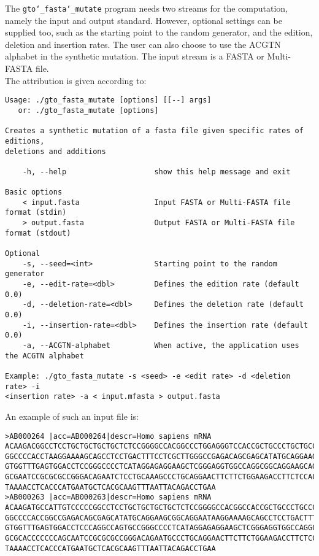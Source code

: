 The \texttt{gto\char`_fasta\char`_mutate} program needs two streams for the computation, namely the input and output standard. However, optional settings can be supplied too, such as the starting point to the random generator, and the edition, deletion and insertion rates. The user can also choose to use the ACGTN alphabet in the synthetic mutation. The input stream is a FASTA or Multi-FASTA file.\\
The attribution is given according to:
\begin{lstlisting}
Usage: ./gto_fasta_mutate [options] [[--] args]
   or: ./gto_fasta_mutate [options]

Creates a synthetic mutation of a fasta file given specific rates of editions, 
deletions and additions

    -h, --help                    show this help message and exit

Basic options
    < input.fasta                 Input FASTA or Multi-FASTA file format (stdin)
    > output.fasta                Output FASTA or Multi-FASTA file format (stdout)

Optional
    -s, --seed=<int>              Starting point to the random generator
    -e, --edit-rate=<dbl>         Defines the edition rate (default 0.0)
    -d, --deletion-rate=<dbl>     Defines the deletion rate (default 0.0)
    -i, --insertion-rate=<dbl>    Defines the insertion rate (default 0.0)
    -a, --ACGTN-alphabet          When active, the application uses the ACGTN alphabet

Example: ./gto_fasta_mutate -s <seed> -e <edit rate> -d <deletion rate> -i 
<insertion rate> -a < input.mfasta > output.fasta
\end{lstlisting}
An example of such an input file is:
\begin{lstlisting}
>AB000264 |acc=AB000264|descr=Homo sapiens mRNA 
ACAAGACGGCCTCCTGCTGCTGCTGCTCTCCGGGGCCACGGCCCTGGAGGGTCCACCGCTGCCCTGCTGCCATTGTCCCC
GGCCCCACCTAAGGAAAAGCAGCCTCCTGACTTTCCTCGCTTGGGCCGAGACAGCGAGCATATGCAGGAAGCGGCAGGAA
GTGGTTTGAGTGGACCTCCGGGCCCCTCATAGGAGAGGAAGCTCGGGAGGTGGCCAGGCGGCAGGAAGCAGGCCAGTGCC
GCGAATCCGCGCGCCGGGACAGAATCTCCTGCAAAGCCCTGCAGGAACTTCTTCTGGAAGACCTTCTCCACCCCCCCAGC
TAAAACCTCACCCATGAATGCTCACGCAAGTTTAATTACAGACCTGAA
>AB000263 |acc=AB000263|descr=Homo sapiens mRNA 
ACAAGATGCCATTGTCCCCCGGCCTCCTGCTGCTGCTGCTCTCCGGGGCCACGGCCACCGCTGCCCTGCCCCTGGAGGGT
GGCCCCACCGGCCGAGACAGCGAGCATATGCAGGAAGCGGCAGGAATAAGGAAAAGCAGCCTCCTGACTTTCCTCGCTTG
GTGGTTTGAGTGGACCTCCCAGGCCAGTGCCGGGCCCCTCATAGGAGAGGAAGCTCGGGAGGTGGCCAGGCGGCAGGAAG
GCGCACCCCCCCAGCAATCCGCGCGCCGGGACAGAATGCCCTGCAGGAACTTCTTCTGGAAGACCTTCTCCTCCTGCAAA
TAAAACCTCACCCATGAATGCTCACGCAAGTTTAATTACAGACCTGAA
\end{lstlisting}

